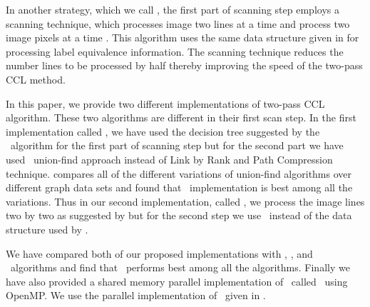 In another strategy, which we call \arun, the first part of scanning step employs a scanning technique, which processes image two lines 
at a time and process two image pixels at a time \cite{He2012_ARun}. This
algorithm uses the same data structure given in \cite{He2008_Run} for processing label equivalence information. The scanning technique reduces the number lines to be
processed by half thereby improving the speed of the two-pass CCL method. %

In this paper, we provide two different implementations of two-pass CCL algorithm. These two algorithms are different in their
first scan step. In the first implementation called \nremsp, we have used the 
decision tree suggested by the \lrpc\ algorithm for the first part of scanning step but for the second part we have used
\rems\ union-find approach instead of Link by Rank and Path Compression technique.
\cite{Patwary2010_RemSP} compares all of the different variations of union-find algorithms over different graph data sets and found that
\rems\ implementation is best among all the variations. Thus in our second implementation, called \aremsp, we process the image lines
two by two as suggested by \cite{He2012_ARun} but for the second step
we use \remsp\ instead of the data structure used by \cite{He2012_ARun}.

We have compared both of our proposed implementations with \lrpc, \run, and
\arun\ algorithms and find that \aremsp\ performs best among all the algorithms.
Finally we have also provided a shared memory parallel implementation of
\aremsp\ called \paremsp\ using OpenMP.
We use the parallel implementation of \remsp\ given in \cite{Patwary2012_PARemSP}. 
